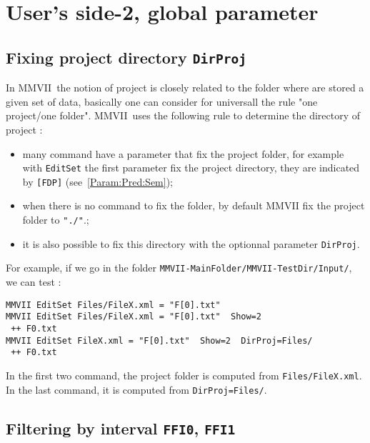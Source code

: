 \documentclass[a4paper]{book}
\newcommand{\PPP}{MMVII}
\newcommand{\MMVIDIR}{{\tt MMVII-MainFolder/}}
\begin{document}
{\section{User's side-2, global parameter}



\subsection{Fixing project directory {\tt DirProj}}

\label{Fix:Dir:Proj}

In \PPP\, the notion of  project is closely related to the folder where
are stored a given set of data, basically one can consider for universall the rule 
"one project/one folder".
\PPP\, uses the following rule to determine the directory of project  :

\begin{itemize}
   \item  many command have a parameter that fix the project folder,
          for example with {\tt EditSet} the first parameter fix the 
          project directory, they are indicated by {\tt [FDP]} (see~\ref{Param:Pred:Sem});

   \item  when there is no command to fix the folder, by default \PPP
          fix the project folder to {\tt "./"}.;

    \item it is also possible to fix this directory with the optionnal
          parameter  {\tt DirProj}.
\end{itemize}

For example, if we go in the folder   {\tt {\MMVIDIR}MMVII-TestDir/Input/}, we can test :

\begin{verbatim}
MMVII EditSet Files/FileX.xml = "F[0].txt"   
MMVII EditSet Files/FileX.xml = "F[0].txt"  Show=2  
 ++ F0.txt
MMVII EditSet FileX.xml = "F[0].txt"  Show=2  DirProj=Files/
 ++ F0.txt
\end{verbatim}

In the first two command, the project folder is computed from {\tt Files/FileX.xml}.
In the last command, it is computed from {\tt DirProj=Files/}.




\subsection{Filtering by interval {\tt FFI0}, {\tt FFI1}}

}
\end{document}
